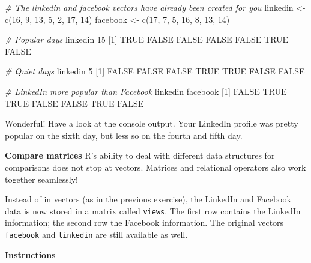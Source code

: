\documentclass[]{article}
\newcommand{\hlnum}[1]{\textcolor[rgb]{0.816,0.125,0.439}{#1}}%
\newcommand{\hlstr}[1]{\textcolor[rgb]{0.251,0.627,0.251}{#1}}%
\newcommand{\hlcom}[1]{\textcolor[rgb]{0.502,0.502,0.502}{\textit{#1}}}%
\newcommand{\hlstd}[1]{\textcolor[rgb]{0.251,0.251,0.251}{#1}}%
\newcommand{\hlkwd}[1]{\textcolor[rgb]{0.878,0.439,0.125}{#1}}%
\newenvironment{Shaded}{\begin{myshaded}}{\end{myshaded}}
\newcommand{\KeywordTok}[1]{\hlkwd{#1}}
\newcommand{\DecValTok}[1]{\hlnum{#1}}
\newcommand{\StringTok}[1]{\hlstr{#1}}
\newcommand{\CommentTok}[1]{\hlcom{#1}}
\newcommand{\OtherTok}[1]{{#1}}
\newcommand{\NormalTok}[1]{\hlstd{#1}}
\begin{document}
\begin{Shaded}
\begin{Highlighting}[]
\CommentTok{# The linkedin and facebook vectors have already been created for you}
\NormalTok{linkedin <-}\StringTok{ }\KeywordTok{c}\NormalTok{(}\DecValTok{16}\NormalTok{, }\DecValTok{9}\NormalTok{, }\DecValTok{13}\NormalTok{, }\DecValTok{5}\NormalTok{, }\DecValTok{2}\NormalTok{, }\DecValTok{17}\NormalTok{, }\DecValTok{14}\NormalTok{)}
\NormalTok{facebook <-}\StringTok{ }\KeywordTok{c}\NormalTok{(}\DecValTok{17}\NormalTok{, }\DecValTok{7}\NormalTok{, }\DecValTok{5}\NormalTok{, }\DecValTok{16}\NormalTok{, }\DecValTok{8}\NormalTok{, }\DecValTok{13}\NormalTok{, }\DecValTok{14}\NormalTok{)}

\CommentTok{# Popular days}
\NormalTok{linkedin }\OperatorTok{>}\StringTok{ }\DecValTok{15}
\NormalTok{   [}\DecValTok{1}\NormalTok{]  }\OtherTok{TRUE} \OtherTok{FALSE} \OtherTok{FALSE} \OtherTok{FALSE} \OtherTok{FALSE}  \OtherTok{TRUE} \OtherTok{FALSE}

\CommentTok{# Quiet days}
\NormalTok{linkedin }\OperatorTok{<=}\StringTok{ }\DecValTok{5}
\NormalTok{   [}\DecValTok{1}\NormalTok{] }\OtherTok{FALSE} \OtherTok{FALSE} \OtherTok{FALSE}  \OtherTok{TRUE}  \OtherTok{TRUE} \OtherTok{FALSE} \OtherTok{FALSE}

\CommentTok{# LinkedIn more popular than Facebook}
\NormalTok{linkedin }\OperatorTok{>}\StringTok{ }\NormalTok{facebook}
\NormalTok{   [}\DecValTok{1}\NormalTok{] }\OtherTok{FALSE}  \OtherTok{TRUE}  \OtherTok{TRUE} \OtherTok{FALSE} \OtherTok{FALSE}  \OtherTok{TRUE} \OtherTok{FALSE}
\end{Highlighting}
\end{Shaded}

Wonderful! Have a look at the console output. Your LinkedIn profile was
pretty popular on the sixth day, but less so on the fourth and fifth
day.

\textbf{Compare matrices} R's ability to deal with different data
structures for comparisons does not stop at vectors. Matrices and
relational operators also work together seamlessly!

Instead of in vectors (as in the previous exercise), the LinkedIn and
Facebook data is now stored in a matrix called \texttt{views}. The first
row contains the LinkedIn information; the second row the Facebook
information. The original vectors \texttt{facebook} and
\texttt{linkedin} are still available as well.

\textbf{Instructions}
\end{document}
